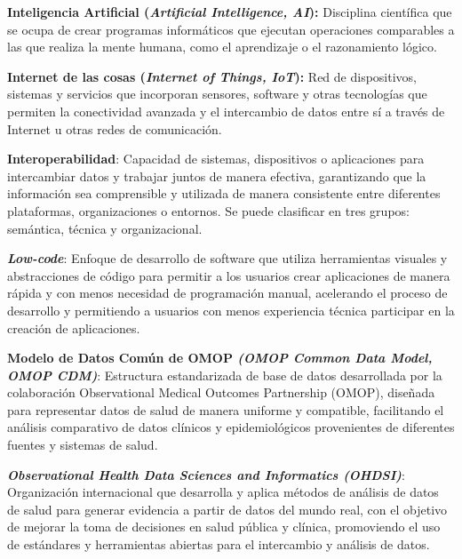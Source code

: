 \textbf{Inteligencia Artificial (\textit{Artificial Intelligence, AI}):} Disciplina científica que se ocupa de crear programas informáticos que ejecutan operaciones comparables a las que realiza la mente humana, como el aprendizaje o el razonamiento lógico.

\textbf{Internet de las cosas (\textit{Internet of Things, IoT}):} Red de dispositivos, sistemas y servicios que incorporan sensores, software y otras tecnologías que permiten la conectividad avanzada y el intercambio de datos entre sí a través de Internet u otras redes de comunicación.


\textbf{Interoperabilidad}: Capacidad de sistemas, dispositivos o aplicaciones para intercambiar datos y trabajar juntos de manera efectiva, garantizando que la información sea comprensible y utilizada de manera consistente entre diferentes plataformas, organizaciones o entornos. Se puede clasificar en tres grupos: semántica, técnica y organizacional.





\textbf{\textit{Low-code}}: Enfoque de desarrollo de software que utiliza herramientas visuales y abstracciones de código para permitir a los usuarios crear aplicaciones de manera rápida y con menos necesidad de programación manual, acelerando el proceso de desarrollo y permitiendo a usuarios con menos experiencia técnica participar en la creación de aplicaciones.


\textbf{Modelo de Datos Común de OMOP \textit{(OMOP Common Data Model, OMOP CDM)}}: Estructura estandarizada de base de datos desarrollada por la colaboración Observational Medical Outcomes Partnership (OMOP), diseñada para representar datos de salud de manera uniforme y compatible, facilitando el análisis comparativo de datos clínicos y epidemiológicos provenientes de diferentes fuentes y sistemas de salud.




\textbf{\textit{Observational Health Data Sciences and Informatics (OHDSI)}}: Organización internacional que desarrolla y aplica métodos de análisis de datos de salud para generar evidencia a partir de datos del mundo real, con el objetivo de mejorar la toma de decisiones en salud pública y clínica, promoviendo el uso de estándares y herramientas abiertas para el intercambio y análisis de datos.

